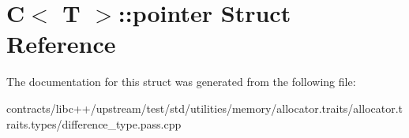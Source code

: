\hypertarget{struct_c_1_1pointer}{}\section{C$<$ T $>$\+:\+:pointer Struct Reference}
\label{struct_c_1_1pointer}


The documentation for this struct was generated from the following file\+:\begin{DoxyCompactItemize}
\item 
contracts/libc++/upstream/test/std/utilities/memory/allocator.\+traits/allocator.\+traits.\+types/difference\+\_\+type.\+pass.\+cpp\end{DoxyCompactItemize}
